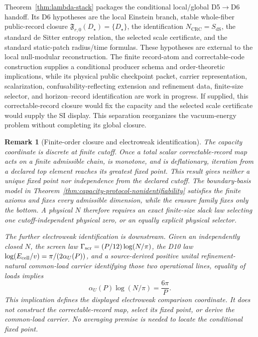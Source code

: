 \documentclass[11pt]{article}
\newtheorem{remark}[theorem]{Remark}
\begin{document}
Theorem~\ref{thm:lambda-stack} packages the conditional local/global D5\(\to\)D6 handoff. Its D6
hypotheses are the local Einstein branch, stable whole-fiber public-record closure
\(\mathfrak F_{r,0}(D_\star)=\{D_\star\}\), the identification
\(N_{\mathrm{CRC}}=S_{\mathrm{dS}}\), the standard de Sitter entropy relation, the selected scale
certificate, and the standard static-patch radius/time formulas. These hypotheses are external to
the local null-modular reconstruction. The finite record-atom and correctable-code construction
supplies a conditional producer schema and order-theoretic implications, while its physical public
checkpoint packet, carrier representation, scalarization, confusability-reflecting extension and
refinement data, finite-size selector, and horizon--record identification are work in progress. If supplied, this
correctable-record closure would fix the capacity and the selected scale
certificate would supply the SI display. This separation reorganizes the vacuum-energy problem
without completing its global closure.

\begin{remark}[Finite-order closure and electroweak identification]\label{rem:l2-l3-capacity}
The capacity coordinate is discrete at finite cutoff. Once a total scalar correctable-record map acts on
a finite admissible chain, is monotone, and is deflationary, iteration from a declared top element
reaches its greatest fixed point. This result gives neither a unique fixed point nor independence
from the declared cutoff. The boundary-basis model in
Theorem~\ref{thm:capacity-protocol-nonidentifiability} satisfies the finite axioms and fixes every
admissible dimension, while the erasure family fixes only the bottom. A physical \(N\) therefore
requires an exact finite-size slack law selecting one cutoff-independent physical zero, or an
equally explicit physical selector.

The further electroweak identification is downstream. Given an independently closed \(N\), the
screen law \(\Gamma_{\rm scr}=(P/12)\log(N/\pi)\), the D10 law
\(\log(E_{\rm cell}/v)=\pi/(2\alpha_U(P))\), and a source-derived positive unital
refinement-natural common-load carrier identifying those two operational lines, equality of loads
implies
\[
\alpha_U(P)\log(N/\pi)=\frac{6\pi}{P}.
\]
This implication defines the displayed electroweak comparison coordinate. It does not construct the
correctable-record map, select its fixed point, or derive the common-load carrier. No averaging premise is
needed to locate the conditional fixed point.
\end{remark}
\end{document}

